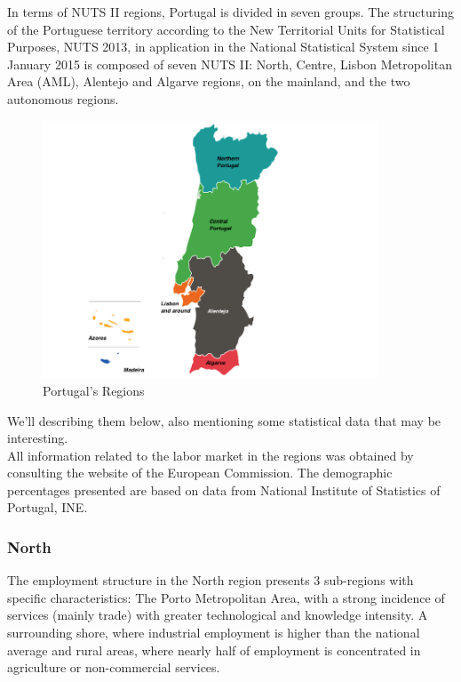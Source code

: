 In terms of NUTS II regions, Portugal is divided in seven groups.
The structuring of the Portuguese territory according to the New Territorial Units for Statistical Purposes, NUTS 2013,  in application in the National Statistical System since 1 January 2015 is composed of seven NUTS II: North, Centre, Lisbon Metropolitan Area (AML), Alentejo and Algarve regions, on the mainland, and the two autonomous regions. \cite{INEE}
\begin{figure}[h]
\centering %
\includegraphics[width=10cm]{images/portugal.png} 

\caption{Portugal's Regions}
\label{figura:qualquernome}
\end{figure}

We'll describing them below, also mentioning some statistical data that may be interesting. \\
All information related to the labor market in the regions was obtained by consulting the \cite{trab} website of the European Commission. The demographic percentages presented are based on data from  National Institute of Statistics of Portugal, INE. 

\subsubsection{North}
The employment structure in the North region presents 3 sub-regions with specific characteristics: 
The Porto Metropolitan Area, with a strong incidence of services (mainly trade) with greater technological and knowledge intensity. A surrounding shore, where industrial employment is  higher than the national average and rural areas, where nearly half of employment is concentrated in agriculture or non-commercial services.

